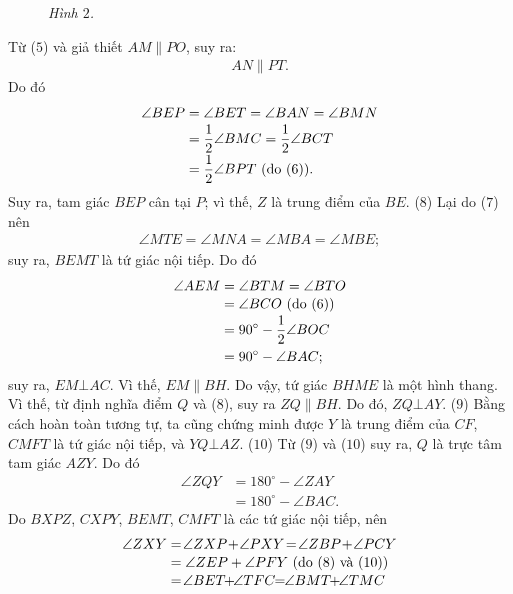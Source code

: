 \begin{multicols}{2}
\begin{figure}[H]
		\caption{\small\textit{\color{thachthuctoanhoc}Hình $2$.}}
		\vspace*{-15pt}
	\end{figure}
	Từ ($5$) và giả thiết $AM \parallel PO$, suy ra:
	\begin{align*}
		AN \parallel PT. \tag{$7$}
	\end{align*}
	Do đó
	\begin{align*}
		\angle BEP &= \angle BET = \angle BAN = \angle BMN \\[-0.5ex]
		&= \dfrac{1}{2}\angle BMC = \dfrac{1}{2}\angle BCT \\[-0.5ex]
		&= \dfrac{1}{2}\angle BPT\,\,({\text{\color{black}do }}(6)).
	\end{align*}
	Suy ra, tam giác $BEP$ cân tại $P$; vì thế, $Z$ là trung điểm của $BE$. \hfill ($8$)
	\vskip 0.05cm
	Lại do ($7$) nên
	\begin{align*}
		\angle MTE = \angle MNA = \angle MBA = \angle MBE;
	\end{align*}
	suy ra, $BEMT$ là tứ giác nội tiếp. Do đó
	\begin{align*}
			\angle AEM &= \angle BTM = \angle BTO \\[-0.5ex]
			&= \angle BCO \,\,({\text{\color{black}do }}(6))\\[-0.5ex]
			 &= 90^\circ - \dfrac{1}{2}\angle BOC \\
			 &= 90^\circ - \angle BAC;
	\end{align*}
	suy ra, $EM \bot AC$. Vì thế, $EM \parallel BH$. Do vậy, tứ giác $BHME$ là một hình thang. Vì thế, từ định nghĩa điểm $Q$ và ($8$), suy ra $ZQ \parallel BH$. Do đó, $ZQ \bot AY$. \hfill ($9$)
	\vskip 0.05cm
	Bằng cách hoàn toàn tương tự, ta cũng chứng minh được $Y$ là trung điểm của $CF$, $CMFT$ là tứ giác nội tiếp, và $YQ \bot AZ$. \hfill ($10$)
	\vskip 0.05cm
	Từ ($9$) và ($10$) suy ra, $Q$ là trực tâm tam giác $AZY$. Do đó
	\begin{align*}
		\angle ZQY &= 180^\circ - \angle ZAY \\[-0.5ex]
		&= 180^\circ - \angle BAC. \tag{$11$}
	\end{align*}
	Do $BXPZ$, $CXPY$, $BEMT$, $CMFT$ là các tứ giác nội tiếp, nên
	\begin{align*}
			\angle ZXY &= \!\angle ZXP \!+\! \angle PXY \!=\! \angle ZBP \!+\! \angle PCY\\[-0.5ex]
			&= \angle ZEP + \angle PFY \,\,({\text{\color{black}do }}(8) \,\,\text{\color{black}và }(10))\\[-0.5ex]
			&= \!\angle BET \!\!+\!\! \angle TFC \!\!=\!\! \angle BMT \!\!+\!\! \angle TMC\\[-0.5ex]

\end{align*}
\end{multicols}
